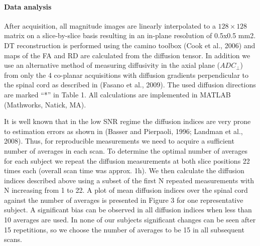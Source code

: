 \paragraph{Data analysis} After acquisition, all magnitude images are linearly interpolated to a $128\times128$ matrix on a slice-by-slice basis resulting in an in-plane resolution of 0.5x0.5 mm2. DT reconstruction is performed using the camino toolbox (Cook et al., 2006) and maps of the FA and RD are calculated from the diffusion tensor. In addition we use an alternative method of measuring diffusivity in the axial plane ($ADC_\perp$) from only the 4 co-planar acquisitions with diffusion gradients perpendicular to the spinal cord as described in (Fasano et al., 2009). The used diffusion directions are marked “*” in Table 1. All calculations are implemented in MATLAB (Mathworks, Natick, MA).

It is well known that in the low SNR regime the diffusion indices are very prone to estimation errors as shown in (Basser and Pierpaoli, 1996; Landman et al., 2008). Thus, for reproducible measurements we need to acquire a sufficient number of averages in each scan. To determine the optimal number of averages for each subject we repeat the diffusion measurements at both slice positions 22 times each (overall scan time was approx. 1h). We then calculate the diffusion indices described above using a subset of the first N repeated measurements with N increasing from 1 to 22. A plot of mean diffusion indices over the spinal cord against the number of averages is presented in Figure 3 for one representative subject. A significant bias can be observed in all diffusion indices when less than 10 averages are used. In none of our subjects significant changes can be seen after 15 repetitions, so we choose the number of averages to be 15 in all subsequent scans.

